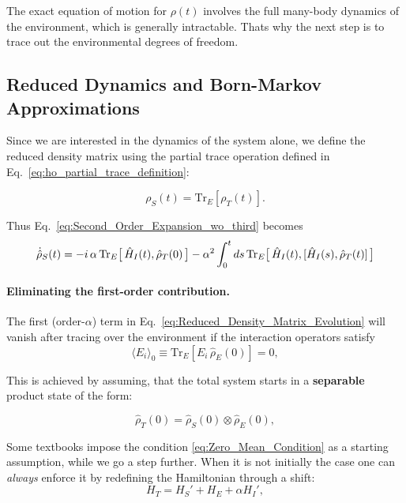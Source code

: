 \noindent
The exact equation of motion for $\rho(t)$ involves the full many-body dynamics of the environment, which is generally intractable. Thats why the next step is to trace out the environmental degrees of freedom.


\subsection{Reduced Dynamics and Born-Markov Approximations}

\noindent
Since we are interested in the dynamics of the system alone, we define the reduced density matrix using the partial trace operation defined in Eq.~\eqref{eq:ho_partial_trace_definition}:

\begin{equation}
	\rho_S(t)= \mathrm{Tr}_E[\rho_T(t)].
	\label{eq:Reduced_Density_Matrix}
\end{equation}

Thus Eq.~\eqref{eq:Second_Order_Expansion_wo_third} becomes
\begin{equation}
	\dot{\hat{\rho}}_S(t) = -i \, \alpha \, \mathrm{Tr}_E\big[\,\hat{H}_I(t),\hat{\rho}_T(0)\,\big]
	- \alpha^2 \int_0^t ds\, \mathrm{Tr}_E \big[\,\hat{H}_I(t), [\hat{H}_I(s), \hat{\rho}_T(t)] \,\big] \notag
	\label{eq:Reduced_Density_Matrix_Evolution}
\end{equation}

\paragraph{Eliminating the first-order contribution.}

\noindent
The first (order-$\alpha$) term in Eq.~\eqref{eq:Reduced_Density_Matrix_Evolution} will vanish after tracing over the environment if the interaction operators satisfy 
\begin{equation}
	\langle E_i \rangle_0 \equiv \mathrm{Tr}_E[E_i \, \hat{\rho}_E(0)] = 0,
	\label{eq:Zero_Mean_Condition}
\end{equation}

\noindent
This is achieved by assuming, that the total system starts in a \textbf{separable} product state of the form:

\begin{equation}
	\hat{\rho}_T(0) = \hat{\rho}_S(0) \otimes \hat{\rho}_E(0),
	\label{eq:Initial_Product_State}
\end{equation}

\noindent
Some textbooks impose the condition \eqref{eq:Zero_Mean_Condition} as a starting assumption, while we go a step further. When it is not initially the case one can \emph{always} enforce it by redefining the Hamiltonian through a shift:
\begin{equation}
	H_T = H_S' + H_E + \alpha H_I',
	\label{eq:Shifted_Total_Hamiltonian}
\end{equation}

